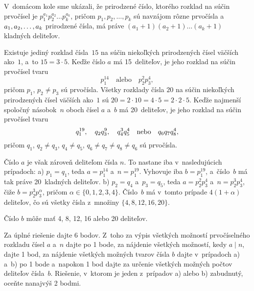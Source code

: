 {%
V~domácom kole sme ukázali, že prirodzené číslo, ktorého rozklad na súčin prvočísel je
$p_1^{a_1}p_2^{a_2}\dots p_k^{a_k}$, pričom $p_1,p_2,\dots,p_k$ sú navzájom rôzne
prvočísla a~$a_1,a_2,\dots,\penalty0 a_k$ prirodzené čísla, má práve
$(a_1+1)(a_2+1)\dots(a_k+1)$ kladných deliteľov.

Existuje jediný rozklad čísla~$15$ na súčin niekoľkých prirodzených čísel väčších ako~$1$,
a~to $15=3\cdot5$. Keďže číslo $a$ má 15~deliteľov, je jeho rozklad na súčin
prvočísel tvaru
$$
p_1^{14}\quad\text{alebo}\quad p_2^2p_3^4,
$$
pričom $p_1$, $p_2\ne p_3$ sú prvočísla.
Všetky rozklady čísla $20$ na súčin niekoľkých prirodzených čísel väčších ako~$1$ sú
$20=2\cdot10=4\cdot5=2\cdot2\cdot5$.
Keďže najmenší spoločný násobok~$n$ oboch čísel $a$ a~$b$ má 20~deliteľov, je jeho rozklad
na súčin prvočísel tvaru
$$
q_1^{19},\quad q_2q_3^{9},\quad q_4^{3}q_5^{4}\quad\hbox{nebo}\quad
q_6q_7q_8^{4},
$$
pričom $q_1$, $q_2\ne q_3$, $q_4\ne q_5$, $q_6\ne q_7\ne q_8\ne q_6$ sú prvočísla.

Číslo $a$ je však zároveň deliteľom čísla $n$. To nastane iba v~nasledujúcich
prípadoch:
\ite a) $p_1=q_1$, teda $a=p_1^{14}$ a~$n=p_1^{19}$. Vyhovuje iba $b=p_1^{19}$,
a~číslo~$b$ má tak práve 20~kladných deliteľov.
\ite b) $p_2=q_4$ a~$p_3=q_5$, teda $a=p_2^2p_3^4$ a~$n=p_2^{3}p_3^{4}$, čiže
$b=p_2^3 p_3^{\alpha}$, pričom
$\alpha\in\{0, 1, 2, 3, 4\}$. Číslo~$b$ má v~tomto prípade
$4(1+\alpha)$ deliteľov, čo sú všetky čísla z~množiny $\{4, 8, 12, 16, 20\}$.

\zaver
Číslo $b$ môže mať 4, 8, 12, 16 alebo 20 deliteľov.

\nobreak\medskip\petit\noindent
Za úplné riešenie dajte 6 bodov.
Z~toho za výpis všetkých možností prvočíselného
rozkladu čísel $a$ a~$n$ dajte po 1 bode, za nájdenie všetkých možností, kedy $a\mid n$,
dajte 1 bod, za nájdenie všetkých možných tvarov čísla $b$ dajte v~prípadoch a) a~b) po
1 bode a~napokon 1 bod dajte za určenie všetkých možných počtov deliteľov čísla~$b$.
Riešenie, v~ktorom je jeden z~prípadov a) alebo b) zabudnutý, oceňte nanajvýš
2 bodmi.\endpetit
\bigbreak
}

